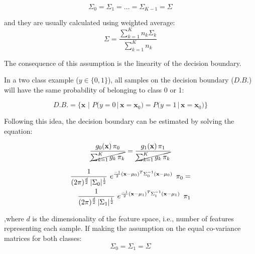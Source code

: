 \documentclass{article}
\begin{document}
\begin{equation} 
\Sigma_0 = \Sigma_1 = \dots = \Sigma_{K-1} = \Sigma
\end{equation}

and they are usually calculated using weighted average:
\begin{equation} 
\Sigma = \frac{\sum_{k=1}^K {n_k\Sigma_k}}{\sum_{k=1}^K{n_k}}
\end{equation}

The consequence of this assumption is the linearity of the decision boundary. %

In a two class example ($y \in \{0,1\}$), all samples on the decision boundary ($D.B.$) will have the same probability of belonging to class 0 or 1:

\begin{equation} 
D.B. = \Big\{\mathbf{x}\,\, \Big| \,\,P\big(y=0 \, \big| \, \mathbf{x}=\mathbf{x}_0\big) = P\big(y=1 \, \big| \, \mathbf{x}=\mathbf{x}_0\big) \Big\}
\end{equation}

Following this idea, the decision boundary can be estimated by solving the equation:

\begin{equation} 
\frac{g_0(\mathbf{x}) \, \pi_0} {\cancel{\sum_{k=1}^K{g_k \, \pi_k}}} = \frac{g_1(\mathbf{x}) \, \pi_1} {\cancel{\sum_{k=1}^K{g_k \, \pi_k}}}
\end{equation}


\begin{equation} 
\begin{split}
\frac{1}{(2 \pi)^{\nicefrac{d}{2}}\, |\Sigma_0|^{\nicefrac{1}{2}}}\,\, e^{\nicefrac{-1}{2}  (\mathbf{x}-\mu_0)^T  \Sigma_0^{-1} (\mathbf{x}-\mu_0)}  \,\,\,\pi_0 = \\
\frac{1}{(2 \pi)^{\nicefrac{d}{2}}\, |\Sigma_1|^{\nicefrac{1}{2}}}\,\, e^{\nicefrac{-1}{2}  (\mathbf{x}-\mu_1)^T  \Sigma_1^{-1} (\mathbf{x}-\mu_1)}  \,\,\,\pi_1
\end{split}
\end{equation}

,where $d$ is the dimensionality of the feature space, i.e., number of features representing each sample.
If making the assumption on the equal co-variance matrices for both classes:
\begin{equation} 
\Sigma_0 = \Sigma_1  = \Sigma
\end{equation}
\end{document}
